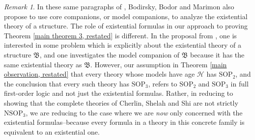 \documentclass{amsart}
\theoremstyle{definition}
\theoremstyle{remark}
\newtheorem{remark}[theorem]{Remark}
\numberwithin{equation}{section}
\begin{document}
\begin{remark}
In these same paragraphs of \cite{BBM25}, Bodirsky, Bodor and Marimon also propose to use core companions, or model companions, to analyze the existential theory of a structure. The role of existential formulas in our approach to proving Theorem \ref{main theorem 3, restated} is different. In the proposal from \cite{BBM25}, one is interested in some problem which is explicitly about the existential theory of a structure $\mathfrak{B}$, and one investigates the model companion of $\mathfrak{B}$ because it has the same existential theory as $\mathfrak{B}$. However, our assumption in Theorem \ref{main observation, restated} that every theory whose models have age $\mathcal{H}$ has $\mathrm{SOP}_{2}$, and the conclusion that every such theory has $\mathrm{SOP}_{3}$, refers to $\mathrm{SOP}_{2}$ and $\mathrm{SOP}_{3}$ in full first-order logic and not just the existential formulas. Rather, in reducing to showing that the complete theories of Cherlin, Shelah and Shi are not strictly $\mathrm{NSOP}_{3}$, we are reducing to the case where we are \textit{now} only concerned with the existential formulas--because every formula in a theory in this concrete family is equivalent to an existential one. 

\end{remark}
\end{document}
